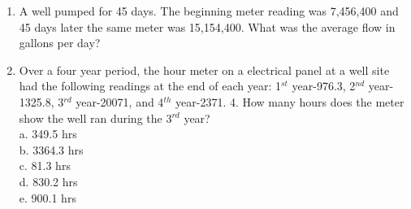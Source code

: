 \begin{enumerate}
\item A well pumped for 45 days. The beginning meter reading was 7,456,400 and 45 days later the same meter was 15,154,400. What was the average flow in gallons per day?

\vspace{1cm}

\item Over a four year period, the hour meter on a electrical panel at a well site had the following readings at the end of each year: 1$^{st}$ year-976.3, 2$^{nd}$ year-1325.8, 3$^{rd}$ year-20071, and 4$^{th}$ year-2371. 4. How many hours does the meter show the well ran during the 3$^{rd}$ year?\\
a.	349.5 hrs\\
b.	3364.3 hrs\\
c.	81.3 hrs\\
d.	830.2 hrs\\
e.	900.1 hrs
\end{enumerate}
